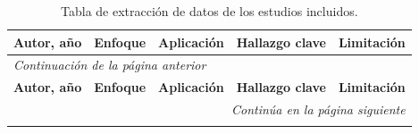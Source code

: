 \begin{longtable}{p{3.0cm} p{2.8cm} p{2.7cm} p{3.5cm} p{2.6cm}}
\caption{Tabla de extracción de datos de los estudios incluidos.}
\label{tab:extraction}\\
\toprule
\textbf{Autor, año} & \textbf{Enfoque} & \textbf{Aplicación} &
\textbf{Hallazgo clave} & \textbf{Limitación} \\
\midrule\endfirsthead
\multicolumn{5}{l}{\small\itshape Continuación de la página anterior}\\
\toprule
\textbf{Autor, año} & \textbf{Enfoque} & \textbf{Aplicación} &
\textbf{Hallazgo clave} & \textbf{Limitación} \\
\midrule\endhead
\midrule\multicolumn{5}{r}{\small\itshape Continúa en la página siguiente}\\\endfoot
\bottomrule\endlastfoot


\end{longtable}

